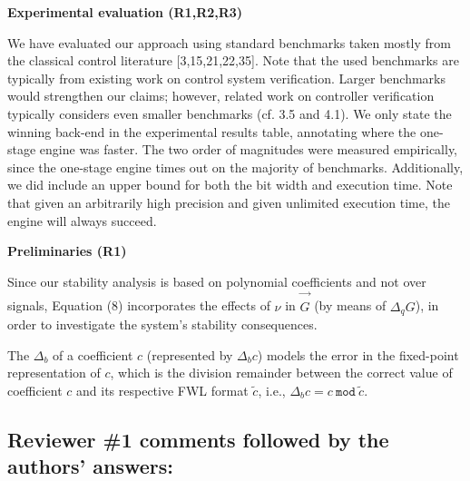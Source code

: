 \documentclass[11pt]{article}
\newcommand\vi{\vspace{\baselineskip}}
\begin{document}
\noindent \textbf{Experimental evaluation (R1,R2,R3)}

\noindent We have evaluated our approach using standard benchmarks taken mostly
from the classical control literature [3,15,21,22,35]. Note that the
used benchmarks are typically from existing work on control system
verification. Larger benchmarks would strengthen our claims; however,
related work on controller verification typically considers even
smaller benchmarks (cf. 3.5 and 4.1). We only state the winning
back-end in the experimental results table, annotating where the one-stage engine
was faster. The two order of magnitudes were measured empirically,
since the one-stage engine times out on the majority of
benchmarks. Additionally, we did include an upper bound for both the
bit width and execution time. Note that given an arbitrarily high precision and
given unlimited execution time, the engine will always succeed.

\noindent \textbf{Preliminaries (R1)}

\noindent Since our stability analysis is based on polynomial coefficients
and not over signals, Equation (8) incorporates the effects of $\nu$ in $\vec{\hat{G}}$
(by means of $\Delta_{q} G$), in order to investigate the system's stability consequences.

\noindent The $\Delta_{b}$ of a coefficient $c$ (represented by $\Delta_{b}c$) models 
the error in the fixed-point representation of $c$, which is the division remainder 
between the correct value of coefficient $c$ and its respective FWL format $\tilde{c}$, 
i.e., $\Delta_{b}c=c~ \texttt{mod}~\tilde{c}$.




\newpage

\vi
\subsection*{Reviewer \#1 comments followed by the authors' answers:}
\end{document}
